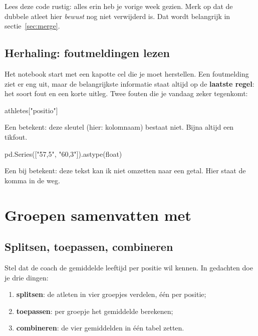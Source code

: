 \documentclass[11pt,a4paper]{article}
\begin{document}
Lees deze code rustig: alles erin heb je vorige week gezien. Merk op dat
de dubbele atleet hier \emph{bewust} nog niet verwijderd is. Dat wordt
belangrijk in sectie~\ref{sec:merge}.

\subsection*{Herhaling: foutmeldingen lezen}

Het notebook start met een kapotte cel die je moet herstellen. Een
foutmelding ziet er eng uit, maar de belangrijkste informatie staat
altijd op de \textbf{laatste regel}: het soort fout en een korte uitleg.
Twee fouten die je vandaag zeker tegenkomt:

\begin{python}[error]
athletes["positio"]
\end{python}

Een  betekent: deze sleutel (hier: kolomnaam) bestaat
niet. Bijna altijd een tikfout.

\begin{python}[error]
pd.Series(["57,5", "60,3"]).astype(float)
\end{python}

Een  bij  betekent: deze tekst kan
ik niet omzetten naar een getal. Hier staat de komma in de weg.

\section{Groepen samenvatten met }

\subsection{Splitsen, toepassen, combineren}

Stel dat de coach de gemiddelde leeftijd per positie wil kennen. In
gedachten doe je drie dingen:

\begin{enumerate}
  \item \textbf{splitsen}: de atleten in vier groepjes verdelen, één per
        positie;
  \item \textbf{toepassen}: per groepje het gemiddelde berekenen;
  \item \textbf{combineren}: de vier gemiddelden in één tabel zetten.
\end{enumerate}
\end{document}
